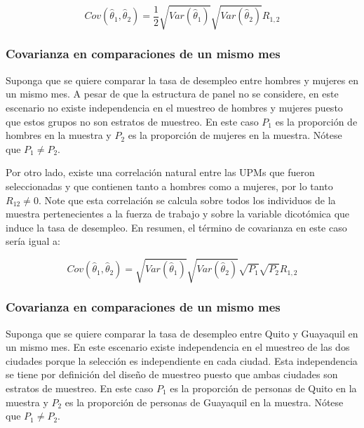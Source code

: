 \documentclass[12pt,spanish,]{book}
\begin{document}
\[
Cov(\hat{\theta}_1, \hat{\theta}_2) = \frac{1}{2}\sqrt{Var(\hat{\theta}_1)}\sqrt{Var(\hat{\theta}_2)}R_{1,2}
\]

\hypertarget{covarianza-en-comparaciones-de-un-mismo-mes}{%
\subsubsection*{Covarianza en comparaciones de un mismo mes}\label{covarianza-en-comparaciones-de-un-mismo-mes}}

Suponga que se quiere comparar la tasa de desempleo entre hombres y mujeres en un mismo mes. A pesar de que la estructura de panel no se considere, en este escenario no existe independencia en el muestreo de hombres y mujeres puesto que estos grupos no son estratos de muestreo. En este caso \(P_1\) es la proporción de hombres en la muestra y \(P_2\) es la proporción de mujeres en la muestra. Nótese que \(P_1 \neq P_2\).

Por otro lado, existe una correlación natural entre las UPMs que fueron seleccionadas y que contienen tanto a hombres como a mujeres, por lo tanto \(R_{12} \neq 0\). Note que esta correlación se calcula sobre todos los individuos de la muestra pertenecientes a la fuerza de trabajo y sobre la variable dicotómica que induce la tasa de desempleo. En resumen, el término de covarianza en este caso sería igual a:

\[
Cov(\hat{\theta}_1, \hat{\theta}_2) = \sqrt{Var(\hat{\theta}_1)}\sqrt{Var(\hat{\theta}_2)}\sqrt{P_1}\sqrt{P_2}R_{1,2}
\]

\hypertarget{covarianza-en-comparaciones-de-un-mismo-mes-1}{%
\subsubsection*{Covarianza en comparaciones de un mismo mes}\label{covarianza-en-comparaciones-de-un-mismo-mes-1}}

Suponga que se quiere comparar la tasa de desempleo entre Quito y Guayaquil en un mismo mes. En este escenario existe independencia en el muestreo de las dos ciudades porque la selección es independiente en cada ciudad. Esta independencia se tiene por definición del diseño de muestreo puesto que ambas ciudades son estratos de muestreo. En este caso \(P_1\) es la proporción de personas de Quito en la muestra y \(P_2\) es la proporción de personas de Guayaquil en la muestra. Nótese que \(P_1 \neq P_2\).
\end{document}

